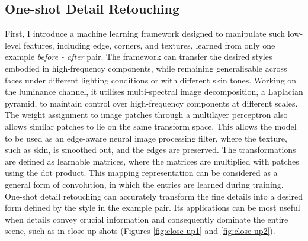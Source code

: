 \subsection{One-shot Detail Retouching}
First, I introduce a machine learning framework designed to manipulate such low-level features, including edge, corners, and textures, learned from only one example \textit{before - after} pair. The framework can transfer the desired styles embodied in high-frequency components, while remaining generalisable across faces under different lighting conditions or with different skin tones. Working on the luminance channel, it utilises multi-spectral image decomposition, a Laplacian pyramid, to maintain control over high-frequency components at different scales. The weight assignment to image patches through a multilayer perceptron also allows similar patches to lie on the same transform space. This allows the model to be used as an edge-aware neural image processing filter, where the texture, such as skin, is smoothed out, and the edges are preserved. The transformations are defined as learnable matrices, where the matrices are multiplied with patches using the dot product. This mapping representation can be considered as a general form of convolution, in which the entries are learned during training. One-shot detail retouching can accurately transform the fine details into a desired form defined by the style in the example pair. Its applications can be most useful when details convey crucial information and consequently dominate the entire scene, such as in close-up shots (Figures \ref{fig:close-up1} and \ref{fig:close-up2}). 





